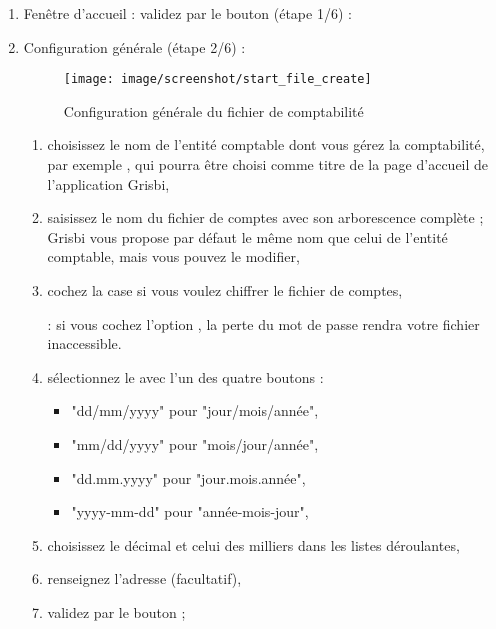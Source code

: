 \begin{enumerate}
	\item Fenêtre d'accueil : validez par le bouton  (étape 1/6) :
	\item Configuration
 générale (étape 2/6)%
 :


		\begin{figure}[htbp]
		\begin{center}
		\texttt{[image: image/screenshot/start\_file\_create]}
		\end{center}
		\caption{Configuration générale du fichier de comptabilité}
		\label{start-file-create}
		\end{figure}
		
		\begin{enumerate} 
		 	\item choisissez le nom de l'entité comptable dont vous gérez la comptabilité, par exemple , qui pourra être choisi comme titre de la page d'accueil de l'application Grisbi,
			\item saisissez le nom du fichier de comptes avec son arborescence complète ; Grisbi vous propose par défaut le même nom que celui de l'entité comptable, mais vous pouvez le modifier,
			\item cochez la case  si vous voulez \gls{chiffrer} le fichier de comptes,
			
			\textcolor{red}{}: si vous cochez l'option , la perte du mot de passe rendra votre fichier inaccessible.
			
			\item sélectionnez le  avec l'un des quatre boutons :
			\begin{addmargin}{-0.2cm}
				\begin{itemize}	
				\item "dd/mm/yyyy" pour "jour/mois/année",
				\item "mm/dd/yyyy" pour "mois/jour/année",
				\item "dd.mm.yyyy" pour "jour.mois.année",
				\item "yyyy-mm-dd" pour "année-mois-jour",
				\end{itemize}
			\end{addmargin}
			\item choisissez le  décimal et celui des milliers dans les listes déroulantes,
			 \item renseignez l'adresse (facultatif),
			 \item  validez par le bouton  ;
		\end{enumerate}
		

\end{enumerate}
